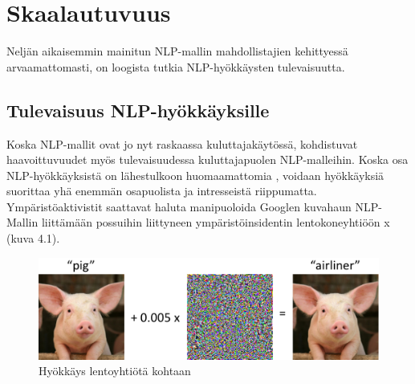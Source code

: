 \chapter{Skaalautuvuus\label{discussion}}
Neljän aikaisemmin mainitun NLP-mallin mahdollistajien kehittyessä arvaamattomasti, on loogista tutkia NLP-hyökkäysten tulevaisuutta. 
\section{Tulevaisuus NLP-hyökkäyksille}
Koska NLP-mallit ovat jo nyt raskaassa kuluttajakäytössä, kohdistuvat haavoittuvuudet myös tulevaisuudessa kuluttajapuolen NLP-malleihin. Koska osa NLP-hyökkäyksistä on lähestulkoon huomaamattomia \citep{DBLP:journals/corr/abs-2111-07970}, voidaan hyökkäyksiä suorittaa yhä enemmän osapuolista ja intresseistä riippumatta. Ympäristöaktivistit saattavat haluta manipuoloida Googlen kuvahaun NLP-Mallin liittämään possuihin liittyneen ympäristöinsidentin lentokoneyhtiöön x (kuva 4.1).
\begin{figure}[t]
  \includegraphics[scale=0.4]{figures/piggie.png}
  \caption{Hyökkäys lentoyhtiötä kohtaan \citep{adversexamples}}
\end{figure}